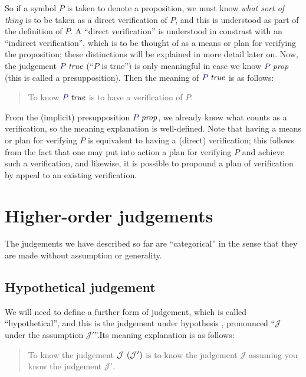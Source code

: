 So if a symbol $P$ is taken to denote a proposition, we must know
\emph{what sort of thing} is to be taken as a direct verification of
$P$, and this is understood as part of the definition of $P$. A
``direct verification'' is understood in constrast with an ``indirect
verification'', which is to be thought of as a means or plan for
verifying the proposition; these distinctions will be explained in
more detail later on. Now, the judgement $\istrue{P}$ (``$P$ is
true'') is only meaningful in case we know $\isprop{P}$ (this is
called a presupposition). Then the meaning of $\istrue{P}$ is as
follows:

\begin{quote}
  To know $\istrue{P}$ is to have a verification of $P$.
\end{quote}

From the (implicit) presupposition $\isprop{P}$, we already know what
counts as a verification, so the meaning explanation is
well-defined. Note that having a means or plan for verifying $P$ is
equivalent to having a (direct) verification; this follows from the
fact that one may put into action a plan for verifying $P$ and achieve
such a verification, and likewise, it is possible to propound a plan
of verification by appeal to an existing verification.

\section{Higher-order judgements}

The judgements we have described so far are ``categorical'' in the sense that
they are made without assumption or generality.

\subsection{Hypothetical judgement}

We will need to define a further form of judgement, which is called
``hypothetical'', and this is the judgement under hypothesis
, pronounced
``$\mathcal{J}$ under the assumption $\mathcal{J}'$''.Its meaning
explanation is as follows:

\begin{quote}
  To know the judgement $\mathcal{J}\ (\mathcal{J}')$ is to know
  the judgement $\mathcal{J}$ assuming you know the
  judgement $\mathcal{J}'$.
\end{quote}

